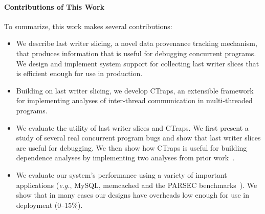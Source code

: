 \documentclass[preprint,10pt]{sigplanconf}
\newcommand{\ctraps}{CTraps\xspace}
\begin{document}




\paragraph{Contributions of This Work}
To summarize, this work makes several contributions:
\begin{itemize}

\item{We describe last writer slicing, a novel data provenance tracking
mechanism, that produces information that is useful for debugging concurrent
programs.  We design and implement system support for collecting last writer
slices that is efficient enough for use in production.  }

\item{Building on last writer slicing, we develop \ctraps, an extensible
framework for implementing analyses of inter-thread communication in
multi-threaded programs.  }

\item{We evaluate the utility of last writer slices and \ctraps. We first
present a study of several real concurrent program bugs and show that last
writer slices are useful for debugging.  We then show how \ctraps is useful for
building dependence analyses by implementing two analyses from prior
work~\cite{cci,defuse,recon}. }

\item{We evaluate our system's performance using a variety of important
applications ({\em e.g.}, MySQL, memcached and the PARSEC
benchmarks~\cite{parsec}).  We show that in many cases our designs have
overheads low enough for use in deployment (0--15\%).}

\end{itemize}
\end{document}
